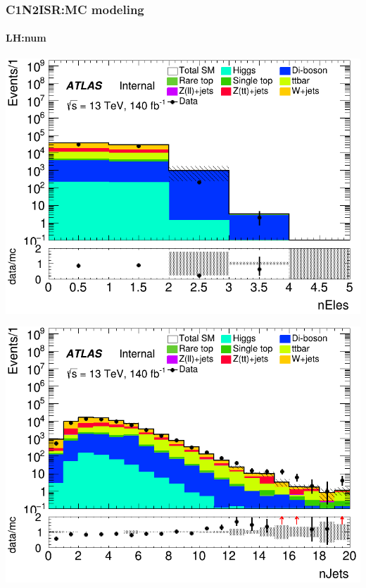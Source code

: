 \documentclass[usenames,dvipsnames]{beamer}
\begin{document}
\begin{frame}
\frametitle{C1N2ISR:MC modeling}
\framesubtitle{LH:\quad num}
    \begin{minipage}{0.32\textwidth}
        \centering
        \includegraphics[width=\textwidth]{graphics/LH_met/LH_met_nEles.png}
    \end{minipage}
    \hfill
    \begin{minipage}{0.32\textwidth}
        \centering
        \includegraphics[width=\textwidth]{graphics/LH_met/LH_met_nJets.png}
    \end{minipage}
    \hfill
    \begin{minipage}{0.32\textwidth}
        \centering

\end{minipage}
\end{frame}
\end{document}

